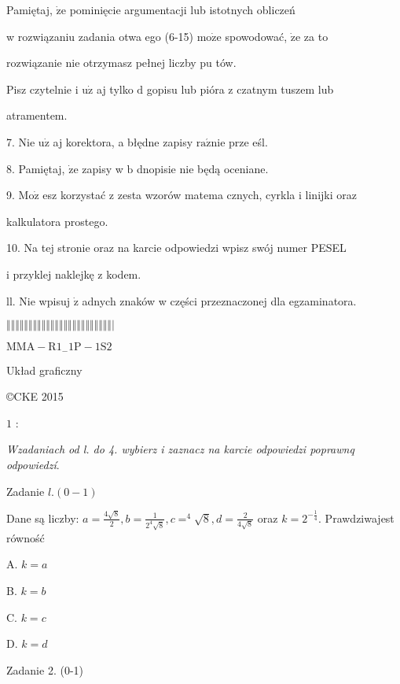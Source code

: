 \documentclass[a4paper,12pt]{article}
\begin{document}
Pamiętaj, $\dot{\mathrm{z}}\mathrm{e}$ pominięcie argumentacji lub istotnych obliczeń

w rozwiązaniu zadania otwa ego (6-15) $\mathrm{m}\mathrm{o}\dot{\mathrm{z}}\mathrm{e}$ spowodować, $\dot{\mathrm{z}}\mathrm{e}$ za to

rozwiązanie nie otrzymasz pełnej liczby pu tów.

Pisz czytelnie i $\mathrm{u}\dot{\mathrm{z}}$ aj tylko $\mathrm{d}$ gopisu lub pióra z czatnym tuszem lub

atramentem.

7. Nie $\mathrm{u}\dot{\mathrm{z}}$ aj korektora, a błędne zapisy $\mathrm{r}\mathrm{a}\acute{\mathrm{z}}\mathrm{n}\mathrm{i}\mathrm{e}$ prze eśl.

8. Pamiętaj, $\dot{\mathrm{z}}\mathrm{e}$ zapisy w $\mathrm{b}$ dnopisie nie będą oceniane.

9. $\mathrm{M}\mathrm{o}\dot{\mathrm{z}}$ esz korzystać z zesta wzorów matema cznych, cyrkla i linijki oraz

kalkulatora prostego.

10. Na tej stronie oraz na karcie odpowiedzi wpisz swój numer PESEL

i przyklej naklejkę z kodem.

ll. Nie wpisuj $\dot{\mathrm{z}}$ adnych znaków w części przeznaczonej dla egzaminatora.

$\Vert\Vert\Vert\Vert\Vert\Vert\Vert\Vert\Vert\Vert\Vert\Vert\Vert\Vert\Vert\Vert\Vert\Vert\Vert\Vert\Vert\Vert\Vert\Vert|$

$\mathrm{M}\mathrm{M}\mathrm{A}-\mathrm{R}1_{-}1\mathrm{P}-1\mathrm{S}2$

Układ graficzny

\copyright CKE 2015

$1$ :




{\it Wzadaniach od l. do 4. wybierz i zaznacz na karcie odpowiedzi poprawnq odpowiedzí}.

Zadanie $l. (0-1)$

Dane są liczby: $a=\displaystyle \frac{4\sqrt{8}}{2}, b=\displaystyle \frac{1}{2^{4}\sqrt{8}}, c=^{4}\sqrt{8}, d=\displaystyle \frac{2}{4\sqrt{8}}$ oraz $k=2^{-\frac{1}{4}}$. Prawdziwajest równość

A. $k=a$

B. $k=b$

C. $k=c$

D. $k=d$

Zadanie 2. (0-1)
\end{document}
